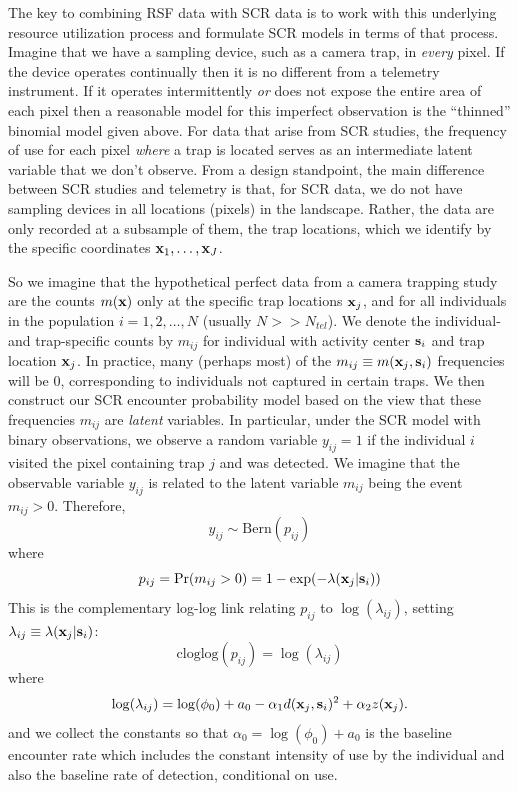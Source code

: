 \documentclass[12pt]{article}
\begin{document}
The key to combining RSF data with SCR data is to work with this
underlying resource utilization process and formulate SCR models in
terms of that process.  Imagine that we have a sampling device, such
as a camera trap, in {\it every} pixel. If the device operates
continually then it is no different from a telemetry instrument.  If
it operates intermittently {\it or} does not expose the entire area of
each pixel then a reasonable model for this imperfect observation is
the ``thinned'' binomial model given above.
For data that
arise from SCR studies, the frequency of use for each pixel {\it where}
  a trap is located serves as an intermediate latent variable that we
don't observe. From a design standpoint, the main difference between
SCR studies and telemetry is that, for SCR data, we do not have
sampling devices in all locations (pixels) in the landscape. Rather,
the data are only recorded at a subsample of them, the trap locations,
which we identify by the specific coordinates ${\bf x}_{1},\ldots,{\bf
  x}_{J}$.

So we imagine
that the hypothetical perfect data from a camera trapping study are
the counts $m({\bf x})$ only at the specific trap locations
${\bf x}_{j}$, and for all individuals in the population
$i=1,2,\ldots,N$
(usually $N >> N_{tel}$). We denote the individual- and
trap-specific counts by $m_{ij}$ for individual with activity center
${\bf s}_{i}$ and trap location ${\bf x}_{j}$.
 In practice, many (perhaps most)
of the $m_{ij} \equiv m({\bf x}_{j},{\bf s}_{i})$ frequencies will be 0,
corresponding to individuals not captured in certain traps.
We then construct our SCR encounter
probability model based on the
view that these frequencies $m_{ij}$ are {\it latent} variables. In particular,
under the SCR model with binary observations,
 we observe a random variable
$y_{ij} = 1$  if the individual $i$ visited the pixel
containing trap $j$ and was detected.
We imagine that the observable variable
$y_{ij}$ is related to the latent variable $m_{ij}$ being the
event $m_{ij}>0$. Therefore,
\[
 y_{ij} \sim \mbox{Bern}(p_{ij})
\]
where
\[
 p_{ij} = \Pr(m_{ij}>0) =  1-\exp(- \lambda({\bf x}_{j}|{\bf s}_{i}))
\]
This is the complementary log-log link relating
$p_{ij}$ to $\log(\lambda_{ij})$, setting
$\lambda_{ij} \equiv \lambda({\bf x}_{j}|{\bf s}_{i})$:
\[
 \mathrm{cloglog}(p_{ij}) = \log(\lambda_{ij})
\]
where
\[
 \log(\lambda_{ij} ) = \log(\phi_{0}) + a_{0} -\alpha_{1} d({\bf
   x}_{j},{\bf s}_{i})^{2} +  \alpha_{2} z({\bf x}_{j}).
\]
and we collect the constants so that $\alpha_{0} = \log(\phi_{0}) +
a_{0}$ is the
 baseline encounter rate which includes
the constant intensity of use by the individual and also the baseline
rate of detection, conditional on use.
\end{document}
